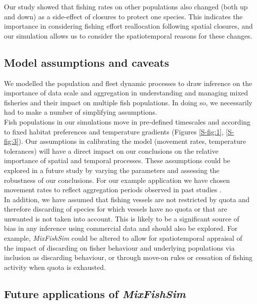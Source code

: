 \documentclass[review]{elsarticle}
\begin{document}
Our study showed that fishing rates on other populations also changed (both up
and down) as a side-effect of closures to protect one species.  This indicates
the importance in considering fishing effort reallocation following spatial
closures, and our simulation allows us to consider the spatiotemporal reasons
for these changes.

\subsection{Model assumptions and caveats}

We modelled the population and fleet dynamic processes to draw inference on the
importance of data scale and aggregation in understanding and managing mixed
fisheries and their impact on multiple fish populations. In doing so, we
necessarily had to make a number of simplifying assumptions. \\

Fish populations in our simulations move in pre-defined timescales and
according to fixed habitat preferences and temperature gradients (Figures
\ref{S-fig:1}, \ref{S-fig:3}). Our assumptions in calibrating the model
(movement rates, temperature tolerances) will have a direct impact on our
conclusions on the relative importance of spatial and temporal processes. These
assumptions could be explored in a future study by varying the parameters and
assessing the robustness of our conclusions. For our example application we
have chosen movement rates to reflect aggregation periods observed in past
studies \citep{Poos2007}. \\

In addition, we have assumed that fishing vessels are not restricted by quota
and therefore discarding of species for which vessels have no quota or that are
unwanted is not taken into account. This is likely to be a significant source
of bias in any inference using commercial data and should also be explored. For
example, \textit{MixFishSim} could be altered to allow for spatiotemporal
appraisal of the impact of discarding on fisher behaviour and underlying
populations via inclusion as discarding behaviour, or through move-on rules or
cessation of fishing activity when quota is exhausted. \\

\subsection{Future applications of \textit{MixFishSim}}
\end{document}
